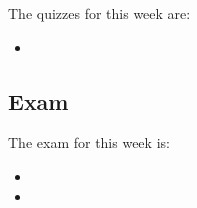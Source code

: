 The quizzes for this week are:

\begin{itemize}
    \item {}
\end{itemize}

\subsection*{Exam}

The exam for this week is:

\begin{itemize}
    \item {}
    \item {}
\end{itemize}